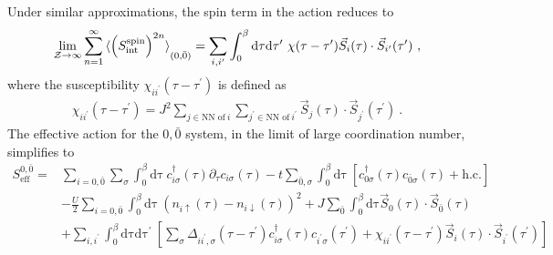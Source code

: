 Under similar approximations, the spin term in the action reduces to
\begin{equation}\begin{aligned}
	\lim_{\mathcal{Z}\to \infty}\sum_{n=1}^\infty \braket{\left(S_\text{int}^\text{spin}\right)^{2n}}_{(0,{\bar 0})} = \sum_{i,i^\prime}\int_0^\beta\mathrm{d\tau}\mathrm{d\tau^\prime}~\chi(\tau - \tau^\prime)\vec{S}_{i}(\tau)\cdot\vec{S}_{i^\prime}(\tau^\prime)~,
\end{aligned}\end{equation}
where the susceptibility \(\chi_{ii^\prime}(\tau - \tau^\prime)\) is defined as 
\begin{equation}\begin{aligned}
	\chi_{ii^\prime}(\tau - \tau^\prime) = J^2\sum_{j \in \text{NN of}~i}\sum_{j^\prime \in \text{NN of}~i^\prime}\vec{S}_{j}(\tau)\cdot\vec{S}_{j^\prime}(\tau^\prime)~.
\end{aligned}\end{equation}
The effective action for the \(0,\bar 0\) system, in the limit of large coordination number, simplifies to
\begin{equation}\begin{aligned}
	S^{0,{\bar 0}}_\text{eff} =& \sum_{i=0,{\bar 0}}\sum_\sigma \int_0^\beta\mathrm{d\tau}~c^\dagger_{i\sigma}(\tau)\partial_\tau c_{i\sigma}(\tau)  - t\sum_{{\bar 0},\sigma}\int_0^\beta\mathrm{d\tau}~\left[c^\dagger_{0\sigma}(\tau)c_{{\bar 0}\sigma}(\tau) + \text{h.c.}\right] \\
							   &- \frac{U}{2}\sum_{i=0,{\bar 0}}\int_0^\beta\mathrm{d\tau}~\left(n_{i \uparrow}(\tau) - n_{i \downarrow}(\tau)\right)^2 + J\sum_{{\bar 0}}\int_0^\beta\mathrm{d\tau} \vec{S}_0(\tau)\cdot\vec{S}_{{\bar 0}}(\tau) \\
							   &+ \sum_{i,i^\prime}\int_0^\beta\mathrm{d\tau}\mathrm{d\tau^\prime}~\left[\sum_{\sigma}\Delta_{ii^\prime,\sigma}(\tau - \tau^\prime)c^\dagger_{i\sigma}(\tau)c_{i^\prime\sigma}(\tau^\prime) + \chi_{ii^\prime}(\tau - \tau^\prime)\vec{S}_{i}(\tau)\cdot\vec{S}_{i^\prime}(\tau^\prime)\right]
\end{aligned}\end{equation}

